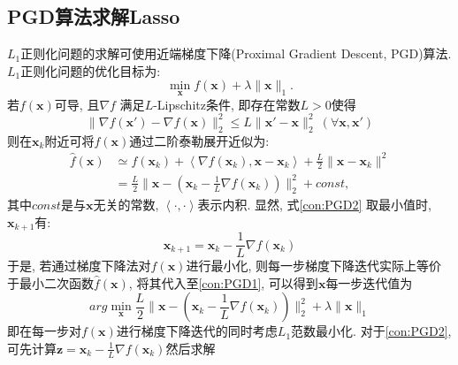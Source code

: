 \subsection{PGD算法求解Lasso}
$L_1$正则化问题的求解可使用近端梯度下降(Proximal Gradient Descent, PGD)算法. $L_1$正则化问题的优化目标为:
\begin{equation}
\underset{\boldsymbol{x}}{\min}f\left( \boldsymbol{x} \right) +\lambda \lVert \boldsymbol{x} \rVert _1. \label{con:PGD1} 
\end{equation}
若$f(\boldsymbol{x})$可导, 且$\nabla f$ 满足$L$-Lipschitz条件, 即存在常数$L>0$使得
\begin{equation}
\lVert \nabla f\left( \boldsymbol{x'} \right) -\nabla f\left( \boldsymbol{x} \right) \rVert _{2}^{2}\le L\lVert \boldsymbol{x'}-\boldsymbol{x} \rVert _{2}^{2}\ \left( \forall \boldsymbol{x,x'} \right) 
\end{equation}
则在$\boldsymbol{x}_k$附近可将$f(\boldsymbol{x})$通过二阶泰勒展开近似为:
\begin{equation}
\begin{aligned}
\hat{f}\left( \boldsymbol{x} \right) &\simeq f\left( \boldsymbol{x}_k \right) +\left< \nabla f\left( \boldsymbol{x}_k \right) ,\boldsymbol{x}-\boldsymbol{x}_k \right> +\frac{L}{2}\lVert \boldsymbol{x}-\boldsymbol{x}_k \rVert ^2 \\
&=\frac{L}{2}\lVert \boldsymbol{x}-\left( \boldsymbol{x}_k-\frac{1}{L}\nabla f\left( \boldsymbol{x}_k \right) \right) \rVert _{2}^{2}+const, \label{con:PGD2} 
\end{aligned}
\end{equation}
其中$const$是与$\boldsymbol{x}$无关的常数, $\left< \cdot ,\cdot \right> $表示内积. 显然,  式\eqref{con:PGD2} 取最小值时, $\boldsymbol{x}_{k+1}$有:
\begin{equation}
\boldsymbol{x}_{k+1}=\boldsymbol{x}_k-\frac{1}{L}\nabla f\left( \boldsymbol{x}_k \right) 
\end{equation}
于是, 若通过梯度下降法对$f(\boldsymbol{x})$进行最小化, 则每一步梯度下降迭代实际上等价于最小二次函数$\hat{f}\left( \boldsymbol{x} \right) $, 将其代入至\eqref{con:PGD1}, 可以得到$ \boldsymbol{x}$每一步迭代值为
\begin{equation}
arg\underset{\boldsymbol{x}}{\min}\frac{L}{2}\lVert \boldsymbol{x}-\left( \boldsymbol{x}_k-\frac{1}{L}\nabla f\left( \boldsymbol{x}_k \right) \right) \rVert _{2}^{2}+\lambda \lVert \boldsymbol{x} \rVert _1
\end{equation}
即在每一步对$f(\boldsymbol{x})$进行梯度下降迭代的同时考虑$L_1$范数最小化. 对于\eqref{con:PGD2}, 可先计算$\boldsymbol{z}=\boldsymbol{x}_k-\frac{1}{L}\nabla f\left( \boldsymbol{x}_k \right) $然后求解
